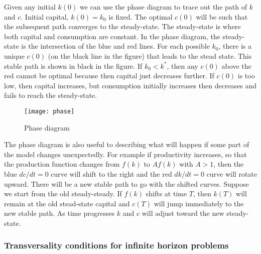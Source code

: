 Given any initial $k(0)$ we can use the phase diagram to trace out the
path of $k$ and $c$. Initial capital, $k(0) = k_0$ is fixed. The
optimal $c(0)$ will be such that the subsequent path converges to the
steady-state. The steady-state is where both capital and consumption
are constant. In the phase diagram, the steady-state is the
intersection of the blue and red lines. For each possible $k_0$, there
is a unique $c(0)$ (on the black line in the figure) that leads to the
stead state. This stable path is shown in black in the figure. If
$k_0<k^*$, then any $c(0)$ above the red cannot be optimal because
then capital just decreases further. If $c(0)$ is too low, then
capital increases, but consumption initially increases then decreases
and fails to reach the steady-state.

\begin{figure}\caption{Phase diagram \label{fig:phase}}
  \begin{minipage}{\linewidth}
    \begin{center}
      \texttt{[image: phase]}
    \end{center}
  \end{minipage}
\end{figure}

The phase diagram is also useful to describing what will happen if
some part of the model changes unexpectedly. For example if
productivity increases, so that the production function changes from
$f(k)$ to $Af(k)$ with $A>1$, then the blue $dc/dt=0$ curve will shift to
the right and the red $dk/dt=0$ curve will rotate upward. There will be a
new stable path to go with the shifted curves. Suppose we start from
the old steady-steady. If $f(k)$ shifts at time $T$, then $k(T)$ will
remain at the old stead-state capital and $c(T)$ will jump immediately
to the new stable path. As time progresses $k$ and $c$ will adjust
toward the new steady-state.


\subsubsection{Transversality conditions for infinite horizon
  problems}

